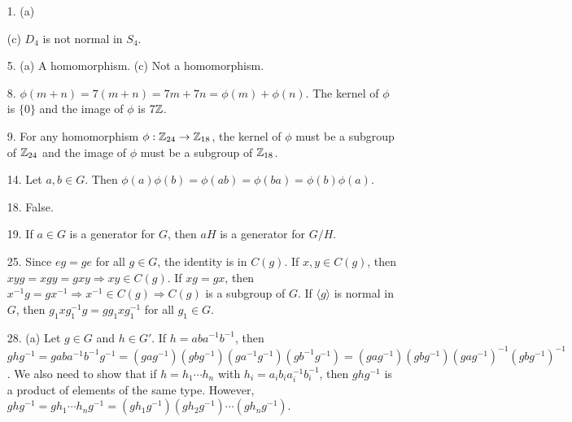{\small
\begin{itemize}
 
\item[1.]
(a)

(c) $D_4$ is not normal in $S_4$.
 
 
\item[5.]
(a) A homomorphism.
(c) Not a homomorphism.
 
 
\item[8.]
$\phi(m + n) = 7(m+n) = 7m + 7n = \phi(m) + \phi(n)$. The kernel of
$\phi$ is $\{ 0 \}$ and the image of $\phi$ is $7{\Bbb Z}$.
 
 
\item[9.]
For any homomorphism $\phi : {\Bbb Z}_{24} \rightarrow {\Bbb
Z}_{18}$, the kernel of $\phi$ must be a subgroup of ${\Bbb Z}_{24}$
and the image of $\phi$ must be a subgroup of ${\Bbb Z}_{18}$.
 
 
\item[14.]
Let $a, b \in G$. Then $\phi(a) \phi(b) = \phi(ab) = \phi(ba) =
\phi(b)\phi(a)$. 
 
\item[18.]
False.
 
\item[19.]
If $a \in G$ is a generator for $G$, then $aH$ is a generator for $G/H$.
 
\item[25.]
Since $eg = ge$ for all $g \in G$, the identity is in $C(g)$. If $x,
y \in C(g)$, then $xy g = x g y = g xy \Rightarrow xy \in C(g)$.  If
$x g = g x$, then $x^{-1} g = g x^{-1} \Rightarrow x^{-1} \in C(g)
\Rightarrow C(g)$ is a subgroup of $G$. If $\langle g \rangle$ is
normal in $G$, then $g_1 x g_1^{-1} g = g g_1 x g_1^{-1}$ for all $g_1
\in G$.
 
\item[28.]
(a)
Let $g \in G$ and $h \in G'$. If $h = aba^{-1}b^{-1}$, then $ghg^{-1}
= gaba^{-1}b^{-1}g^{-1} 
= (gag^{-1})(gbg^{-1})(ga^{-1}g^{-1})(gb^{-1}g^{-1}) 
= (gag^{-1})(gbg^{-1})(gag^{-1})^{-1}(gbg^{-1})^{-1}$. We also need to
show that if $h = h_1 \cdots h_n$ with $h_i = a_i b_i a_i^{-1}
b_i^{-1}$, then $ghg^{-1}$ is a product of elements of the same type.
However, $ghg^{-1} = g h_1 \cdots h_n g^{-1} =
(gh_1g^{-1})(gh_2g^{-1}) \cdots (gh_ng^{-1})$.
 
 
 
 
\end{itemize}
}

